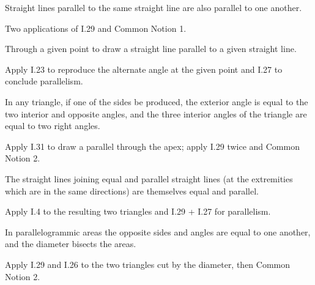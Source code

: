 \documentclass{rrxiv}
\begin{document}
\begin{claim}
\label{prop:I.30}
Straight lines parallel to the same straight line are also parallel
to one another.
\end{claim}
\begin{evidence}[Proof of I.30]
\label{ev:I.30}
Two applications of I.29 and Common Notion 1.
\end{evidence}

\begin{claim}
\label{prop:I.31}
Through a given point to draw a straight line parallel to a given
straight line.
\end{claim}
\begin{evidence}[Proof of I.31]
\label{ev:I.31}
Apply I.23 to reproduce the alternate angle at the given point and
I.27 to conclude parallelism.
\end{evidence}

\begin{claim}
\label{prop:I.32}
In any triangle, if one of the sides be produced, the exterior angle
is equal to the two interior and opposite angles, and the three
interior angles of the triangle are equal to two right angles.
\end{claim}
\begin{evidence}[Proof of I.32]

\label{ev:I.32}
Apply I.31 to draw a parallel through the apex; apply I.29 twice and
Common Notion 2.
\end{evidence}

\begin{claim}
\label{prop:I.33}
The straight lines joining equal and parallel straight lines (at the
extremities which are in the same directions) are themselves equal
and parallel.
\end{claim}
\begin{evidence}[Proof of I.33]
\label{ev:I.33}
Apply I.4 to the resulting two triangles and I.29 + I.27 for
parallelism.
\end{evidence}

\begin{claim}
\label{prop:I.34}
In parallelogrammic areas the opposite sides and angles are equal to
one another, and the diameter bisects the areas.
\end{claim}
\begin{evidence}[Proof of I.34]
\label{ev:I.34}
Apply I.29 and I.26 to the two triangles cut by the diameter, then
Common Notion 2.
\end{evidence}
\end{document}
